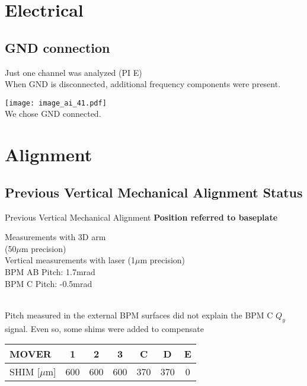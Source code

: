 \section{Electrical}
\subsection{GND connection}
 Just one channel was analyzed (PI E)\\
 When GND is {\color{green}disconnected}, additional frequency components were present.\par
\texttt{[image: image\_ai\_41.pdf]}\\
We chose {\color{blue}GND connected}.\par

\section{Alignment}
\subsection{Previous Vertical Mechanical Alignment Status}
Previous Vertical Mechanical Alignment
\centering\vspace*{0cm}
\textbf{Position referred to {\color{blue} baseplate}}\\
\raggedright
\begin{minipage}{0.5\textwidth}
\end{minipage}\hfill\hspace*{-2cm}\vspace*{2cm}
\begin{minipage}{0.5\textwidth}
Measurements with 3D arm\\
\hspace*{0.5cm}(50$\mu$m precision)\\
Vertical measurements with laser
\hspace*{0.5cm}(1$\mu$m precision)\\
BPM AB Pitch: 1.7mrad\\
BPM C Pitch: -0.5mrad
\end{minipage}\\\vspace*{-1.2cm}
Pitch measured in the external BPM surfaces did not explain the BPM C $Q_y$ signal. Even so, some shims were added to compensate
\begin{center}
\begin{tabular}{|l|c|c|c|c|c|c|}\hline
 MOVER & 1&2&3&C&D&E\\\hline
 SHIM [$\mu$m]& 600&600&600&370&370&0\\\hline
\end{tabular}
\end{center}




